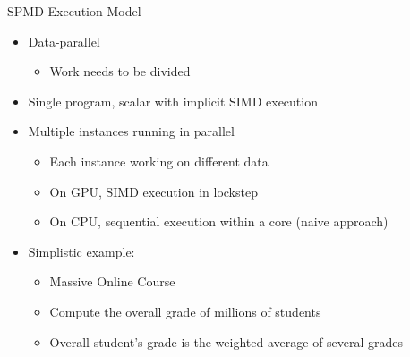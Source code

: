 
\begin{frame}{SPMD Execution Model}

\begin{itemize}
    \item Data-parallel
    \begin{itemize}
        \item Work needs to be divided
    \end{itemize}
    
    \item Single program, scalar with implicit SIMD execution
    
    \item Multiple instances running in parallel
    \begin{itemize}
        \item Each instance working on different data
        \item On GPU, SIMD execution in lockstep
        \item On CPU, sequential execution within a core (naive approach)
    \end{itemize}
\end{itemize}

\begin{itemize}
    \item Simplistic example:
    \begin{itemize}
        \item Massive Online Course
        \item Compute the overall grade of millions of students
        \item Overall student's grade is the weighted average of several grades
    \end{itemize}
\end{itemize}

\end{frame}



